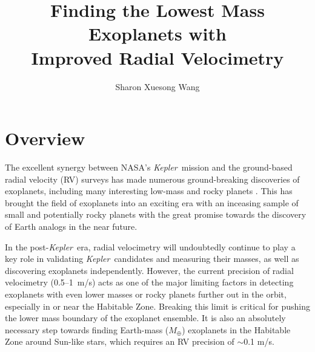 \documentclass[12pt]{article}
\def\mps{m/s}
\def\mearth{M_{\oplus}}
\def\kepler{{\it Kepler}}
\begin{document}

\title{\vspace{-45pt} \bf \Large Finding the Lowest Mass Exoplanets with
  \\ Improved Radial Velocimetry \vspace{-6pt}}
\author{\normalsize Sharon Xuesong Wang}
\date{}
\maketitle

\vspace{-30pt}
\section{Overview}

The excellent synergy between NASA's \kepler\ mission and the
ground-based radial velocity (RV) surveys has made numerous
ground-breaking discoveries of exoplanets, including many interesting
low-mass and rocky planets
\citep[e.g.,][]{howard2013,pepe2013,marcy2014}. This has brought the
field of exoplanets into an exciting era with an inceasing sample of
small and potentially rocky planets \citep{weiss2013} with the great
promise towards the discovery of Earth analogs in the near future.

In the post-\kepler\ era, radial velocimetry will undoubtedly continue
to play a key role in validating \kepler\ candidates and measuring
their masses, as well as discovering exoplanets
independently. However, the current precision of radial velocimetry
(0.5--1~\mps) acts as one of the major limiting factors in detecting
exoplanets with even lower masses or rocky planets further out in the
orbit, especially in or near the Habitable Zone. Breaking this limit
is critical for pushing the lower mass boundary of the exoplanet
ensemble. It is also an absolutely necessary step towards finding
Earth-mass ($\mearth$) exoplanets in the Habitable Zone around
Sun-like stars, which requires an RV precision of $\sim$0.1 \mps.
\end{document}
